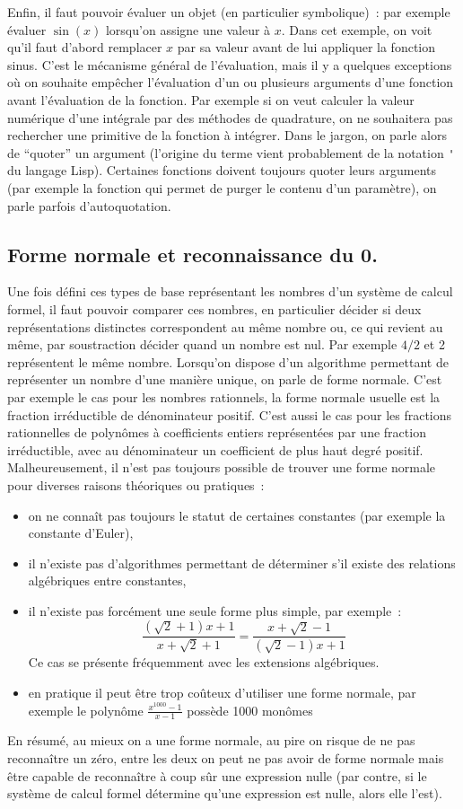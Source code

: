 \documentclass[a4paper,11pt]{article}
\begin{document}
Enfin, il faut pouvoir \'evaluer un objet (en particulier symbolique)~:
par exemple évaluer $\sin(x)$ lorsqu'on assigne une valeur \`a $x$. 
Dans cet exemple, on voit qu'il faut d'abord remplacer $x$ par
sa valeur avant de lui appliquer la fonction sinus. C'est le mécanisme
général de l'évaluation, mais il y a quelques exceptions où
on souhaite empêcher l'évaluation d'un ou plusieurs arguments
d'une fonction avant l'évaluation de la fonction. Par exemple si on 
veut calculer la valeur numérique d'une intégrale par des méthodes
de quadrature, on ne souhaitera pas rechercher une primitive de la 
fonction à intégrer. Dans le jargon, on parle alors de ``quoter'' un argument 
(l'origine du terme vient probablement de la notation \verb|'| du langage 
Lisp). Certaines fonctions doivent toujours quoter leurs arguments
(par exemple la fonction qui permet de purger le contenu d'un paramètre),
on parle parfois d'autoquotation.


\subsection{Forme normale et reconnaissance du 0.}
Une fois défini ces types de base représentant les nombres d'un système de 
calcul formel, il faut pouvoir comparer ces 
nombres, en particulier décider si deux représentations distinctes 
correspondent au m\^eme nombre ou, ce qui revient au 
m\^eme, par soustraction décider quand un nombre est nul. 
Par exemple $4/2$ et 2 représentent le m\^eme nombre. 
Lorsqu'on dispose d'un algorithme permettant de représenter un nombre 
d'une manière unique, on parle de forme normale. 
C'est par exemple le cas pour les nombres rationnels, la forme normale 
usuelle est la fraction irréductible de 
dénominateur positif. C'est aussi le cas pour les fractions rationnelles 
de polynômes à coefficients entiers représentées par une fraction 
irréductible, avec au dénominateur un coefficient de plus haut degré
positif.
Malheureusement, il n'est pas toujours possible de trouver une forme normale
pour diverses raisons théoriques ou pratiques~: 
\begin{itemize}
\item on ne connaît pas toujours le statut de certaines constantes
(par exemple la constante d'Euler),
\item il n'existe pas d'algorithmes permettant de déterminer
s'il existe des relations algébriques entre constantes,
\item il n'existe pas forcément une seule forme plus simple, par exemple~:
\[ \frac{(\sqrt{2}+1)x+1}{x+\sqrt{2}+1}=\frac{x+\sqrt{2}-1}{(\sqrt{2}-1)x+1} \]
Ce cas se présente fréquemment avec les extensions algébriques.
\item en pratique il peut être trop coûteux d'utiliser une forme
normale, par exemple le polynôme $\frac{x^{1000}-1}{x-1}$ possède 1000 monômes
\end{itemize}
En résumé, au mieux on a une forme normale, au pire on risque de ne pas 
reconnaître un zéro, entre les deux on peut ne
pas avoir de forme normale mais être capable de reconnaître à coup sûr 
une expression nulle (par contre, si le système 
de calcul formel détermine qu'une expression est nulle, alors elle l'est).
\end{document}
